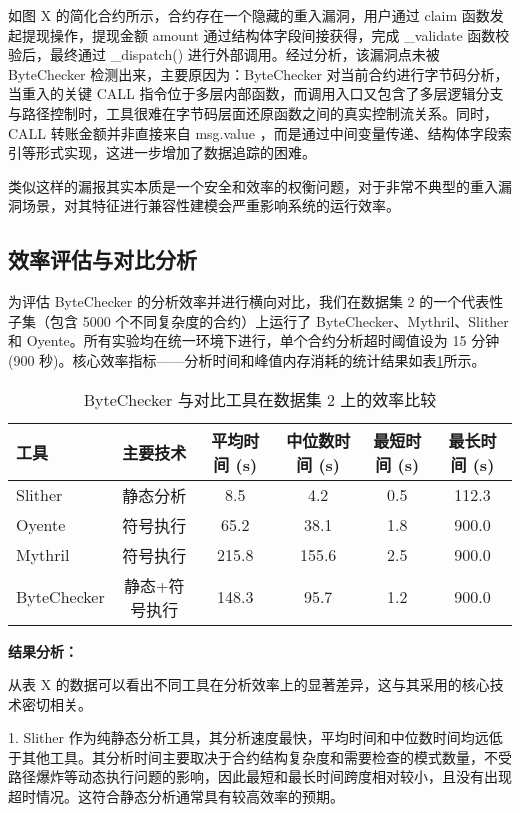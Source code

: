 \documentclass[print, master, vlined, timesmath]{DissertUESTC}
\begin{document}
如图 X 的简化合约所示，合约存在一个隐藏的重入漏洞，用户通过 claim 函数发起提现操作，提现金额 amount 通过结构体字段间接获得，完成 \_validate 函数校验后，最终通过 \_dispatch() 进行外部调用。经过分析，该漏洞点未被 ByteChecker 检测出来，主要原因为：ByteChecker 对当前合约进行字节码分析，当重入的关键 CALL 指令位于多层内部函数，而调用入口又包含了多层逻辑分支与路径控制时，工具很难在字节码层面还原函数之间的真实控制流关系。同时，CALL 转账金额并非直接来自 msg.value ，而是通过中间变量传递、结构体字段索引等形式实现，这进一步增加了数据追踪的困难。

类似这样的漏报其实本质是一个安全和效率的权衡问题，对于非常不典型的重入漏洞场景，对其特征进行兼容性建模会严重影响系统的运行效率。


\subsection{效率评估与对比分析}

为评估 ByteChecker 的分析效率并进行横向对比，我们在数据集 2 的一个代表性子集（包含 5000 个不同复杂度的合约）上运行了 ByteChecker、Mythril、Slither 和 Oyente。所有实验均在统一环境下进行，单个合约分析超时阈值设为 15 分钟 (900 秒)。核心效率指标——分析时间和峰值内存消耗的统计结果如表\ref{tab:efficiency_comparison}所示。

\begin{table}[H]
    \centering
    \caption{ByteChecker 与对比工具在数据集 2 上的效率比较}
    \begin{tabularx}{\linewidth}{lccccc}
        \toprule
        \textbf{工具} & \textbf{主要技术} & \textbf{平均时间 (s)} & \textbf{中位数时间 (s)} & \textbf{最短时间 (s)} & \textbf{最长时间 (s)} \\
        \midrule
        Slither & 静态分析 & 8.5 & 4.2 & 0.5 & 112.3 \\
        Oyente & 符号执行  & 65.2 & 38.1 & 1.8 & 900.0  \\
        Mythril & 符号执行 & 215.8 & 155.6 & 2.5 & 900.0 \\
        ByteChecker & 静态+符号执行 & 148.3 & 95.7 & 1.2 & 900.0 \\
        \bottomrule
    \end{tabularx}
    \label{tab:efficiency_comparison}
\end{table}

\textbf{结果分析：}

从表 X 的数据可以看出不同工具在分析效率上的显著差异，这与其采用的核心技术密切相关。

1.  Slither 作为纯静态分析工具，其分析速度最快，平均时间和中位数时间均远低于其他工具。其分析时间主要取决于合约结构复杂度和需要检查的模式数量，不受路径爆炸等动态执行问题的影响，因此最短和最长时间跨度相对较小，且没有出现超时情况。这符合静态分析通常具有较高效率的预期。
\end{document}
